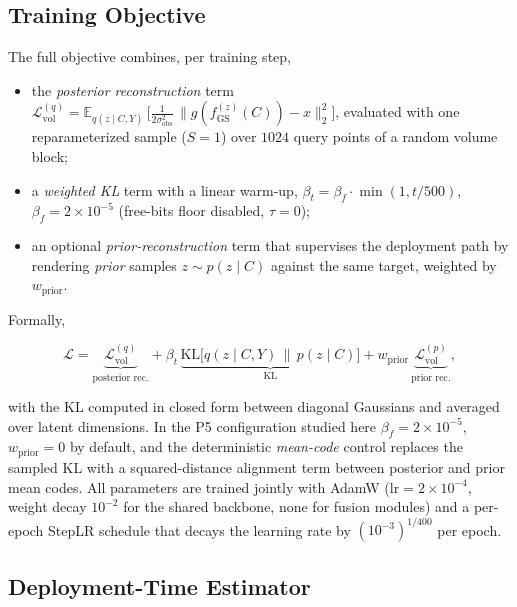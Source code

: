\subsection{Training Objective}
\label{sec:method:loss}

The full objective combines, per training step,
\begin{itemize}
\item the \emph{posterior reconstruction} term
      $\mathcal{L}_{\mathrm{vol}}^{(q)}=\mathbb{E}_{q(z\mid C,Y)}\,
      \big[\tfrac{1}{2\sigma_{\mathrm{obs}}^2}\,\|g(f_{\mathrm{GS}}^{(z)}(C))-x\|_2^2\big]$,
      evaluated with one reparameterized sample ($S=1$) over $1024$
      query points of a random volume block;
\item a \emph{weighted KL} term with a linear warm-up,
      $\beta_t = \beta_f\cdot\min(1, t/500)$, $\beta_f = 2\times10^{-5}$
      (free-bits floor disabled, $\tau=0$);
\item an optional \emph{prior-reconstruction} term that supervises the
      deployment path by rendering \emph{prior} samples
      $z\sim p(z\mid C)$ against the same target, weighted by
      $w_{\mathrm{prior}}$.
\end{itemize}
Formally,

\begin{equation}
    \mathcal{L}
    = \underbrace{\mathcal{L}_{\mathrm{vol}}^{(q)}}_{\text{posterior rec.}}
    + \beta_t\,
      \underbrace{\mathrm{KL}\big[q(z\mid C,Y)\,\|\,p(z\mid C)\big]}_{\text{KL}}
    + w_{\mathrm{prior}}\,
      \underbrace{\mathcal{L}_{\mathrm{vol}}^{(p)}}_{\text{prior rec.}},
    \label{eq:loss}
\end{equation}

with the KL computed in closed form between diagonal Gaussians and
averaged over latent dimensions. In the P5 configuration studied here
$\beta_f=2{\times}10^{-5}$, $w_{\mathrm{prior}}=0$ by default, and the
deterministic \emph{mean-code} control replaces the sampled KL with a
squared-distance alignment term between posterior and prior mean codes.
All parameters are trained jointly with AdamW ($\mathrm{lr}=2{\times}10^{-4}$,
weight decay $10^{-2}$ for the shared backbone, none for fusion modules)
and a per-epoch StepLR schedule that decays the learning rate by
$(10^{-3})^{1/400}$ per epoch.

\subsection{Deployment-Time Estimator}
\label{sec:method:inference}

